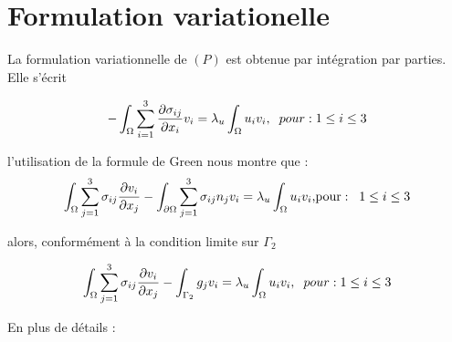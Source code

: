 \documentclass[a4paper,11pt]{article}   %
\begin{document}
%
%
%



\section{Formulation variationelle}
La formulation variationnelle de $(P)$ est obtenue par intégration par parties. Elle s’écrit


$$-\int_{\Omega} \sum_{i=1}^{3} \frac{\partial \sigma_{ij}}{\partial x_{i}} v_{i} = \lambda _u \int_{\Omega} u_{i} v_{i},\hspace{0.2cm} pour : 1 \leq i \leq 3$$ 

l'utilisation de la formule de Green nous montre que :\\

$$\int_{\Omega} \sum_{j=1}^{3} \sigma_{ij} \frac{\partial v_{i}}{\partial x_{j}} - \int_{\partial \Omega} \sum_{j=1}^{3}\sigma_{ij}n_{j}v_{i}  = \lambda _u \int_{\Omega} u_{i}v_{i} \text{,pour} :\hspace{0.2cm} 1 \leq i \leq 3$$ 

alors, conformément à la condition limite sur $\Gamma_{2}$

$$\int_{\Omega}\sum_{j=1}^{3}\sigma_{ij}\frac{\partial v_{i}}{\partial x_{j}} - \int_{\Gamma_{2}}g_{j}v_{i}  =\lambda _u \int_{\Omega}u_{i}v_{i},\hspace{0.2cm} pour : 1\leq i \leq 3$$ 



En plus de détails : \\
\end{document}
